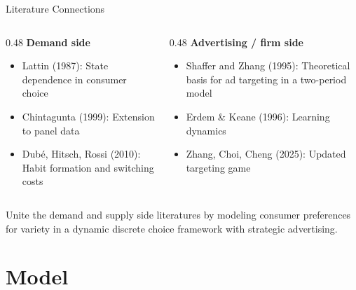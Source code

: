 \documentclass[aspectratio=169,professionalfonts]{beamer}
\newcommand{\hl}[1]{\textbf{\textcolor{UGARed}{#1}}}
\begin{document}
\begin{frame}{Literature Connections}
  \begin{columns}[T]
    \begin{column}{0.48\textwidth}
      \hl{Demand side}
      \begin{itemize}
        \item Lattin (1987): State dependence in consumer choice
        \item Chintagunta (1999): Extension to panel data
        \item Dub\'e, Hitsch, Rossi (2010): Habit formation and switching costs
      \end{itemize}
    \end{column}
    \begin{column}{0.48\textwidth}
      \hl{Advertising / firm side}
      \begin{itemize}
        \item Shaffer and Zhang (1995): Theoretical basis for ad targeting in a two-period model
        \item Erdem \& Keane (1996): Learning dynamics
        \item Zhang, Choi, Cheng (2025): Updated targeting game
      \end{itemize}
    \end{column}
  \end{columns}

  \vspace{1pt}
  \begin{tcolorbox}[colback=red!5!white, colframe=UGARed, title=\textbf{Contribution}]
    Unite the demand and supply side literatures by modeling consumer preferences for variety in a dynamic discrete choice framework with strategic advertising.
  \end{tcolorbox}
\end{frame}

\section{Model}
\end{document}
